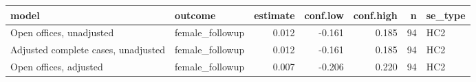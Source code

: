 
\begin{tabular}{llrrrrl}
\toprule
model & outcome & estimate & conf.low & conf.high & n & se\_type\\
\midrule
Open offices, unadjusted & female\_followup & 0.012 & -0.161 & 0.185 & 94 & HC2\\
Adjusted complete cases, unadjusted & female\_followup & 0.012 & -0.161 & 0.185 & 94 & HC2\\
Open offices, adjusted & female\_followup & 0.007 & -0.206 & 0.220 & 94 & HC2\\
\bottomrule
\end{tabular}
